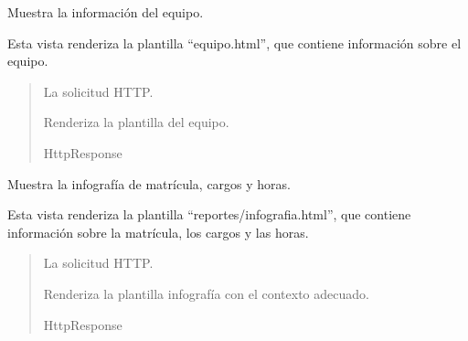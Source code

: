 \documentclass[letterpaper,10pt,spanish]{sphinxmanual}
\begin{document}
\begin{fulllineitems}

\pysigstartsignatures
{}
\pysigstopsignatures
\sphinxAtStartPar
Muestra la información del equipo.

\sphinxAtStartPar
Esta vista renderiza la plantilla “equipo.html”, que
contiene información sobre el equipo.
\begin{quote}\begin{description}
\sphinxAtStartPar
{} \textendash{} La solicitud HTTP.

\sphinxAtStartPar
Renderiza la plantilla del equipo.

\sphinxAtStartPar
HttpResponse

\end{description}\end{quote}

\end{fulllineitems}



\begin{fulllineitems}

\pysigstartsignatures
{}
\pysigstopsignatures
\sphinxAtStartPar
Muestra la infografía de matrícula, cargos y horas.

\sphinxAtStartPar
Esta vista renderiza la plantilla “reportes/infografia.html”,
que contiene información sobre la matrícula, los cargos y las horas.
\begin{quote}\begin{description}
\sphinxAtStartPar
{} \textendash{} La solicitud HTTP.

\sphinxAtStartPar
Renderiza la plantilla infografía con el contexto adecuado.

\sphinxAtStartPar
HttpResponse

\end{description}\end{quote}

\end{fulllineitems}
\end{document}
